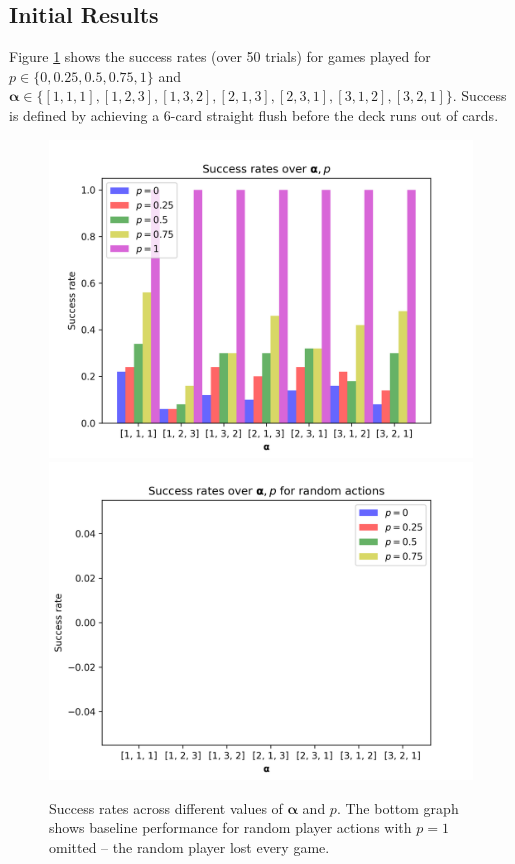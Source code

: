 \documentclass[11pt]{article}
\begin{document}
\subsection{Initial Results}

Figure \ref{fig:success} shows the success rates (over 50 trials) for games played for $p \in \{0, 0.25, 0.5, 0.75, 1\}$ and $\bm{\alpha} \in \{[1,1,1], [1,2,3], [1,3,2], [2,1,3], [2,3,1], [3,1,2], [3,2,1]\}$. Success is defined by achieving a 6-card straight flush before the deck runs out of cards.

\begin{figure}[hpt]
  \centering
  \captionsetup{justification=centering,margin=2cm}
  \includegraphics[scale=0.8]{../plots/successAlphaP.png}
  \includegraphics[scale=0.8]{../plots/successAlphaP_RANDOM.png}
  \caption{Success rates across different values of $\bm{\alpha}$ and $p$. The bottom graph shows baseline performance for random player actions with $p=1$ omitted -- the random player lost every game.}
  \label{fig:success}
\end{figure}
\end{document}
